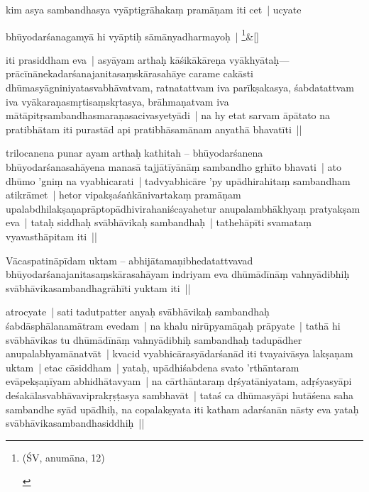 \documentclass[article,12pt,a4paper]{memoir}
\newcommand{\persName}[1]{#1}
\begin{document}
	  \pstart kim asya sambandhasya vyāptigrāhakaṃ pramāṇam iti cet | ucyate
	\pend
      
	    
	    \stanza[\smallbreak]
	bhūyodarśanagamyā hi vyāptiḥ sāmānyadharmayoḥ | \footnote{\begin{english}(ŚV, anumāna, 12)\end{english}}\&[\smallbreak]


	

	  \pstart iti prasiddham eva | asyāyam arthaḥ kāśikākāreṇa vyākhyātaḥ—prācīnānekadarśanajanitasaṃskārasahāye carame  cakāsti dhūmasyāgniniyatasvabhāvatvam, ratnatattvam iva parīkṣakasya, śabdatattvam iva vyākaraṇasmṛtisaṃskṛtasya, brāhmaṇatvam iva mātāpitṛsambandhasmaraṇasacivasyetyādi | na hy etat sarvam āpātato na pratibhātam iti purastād api pratibhāsamānam anyathā bhavatīti ||
	\pend
      

	  \pstart \persName{trilocanena} punar ayam arthaḥ kathitah – \label{sarit__ratnakīrtinibandhāvali__125156}bhūyodarśanena bhūyodarśanasahāyena manasā tajjātīyānāṃ sambandho gṛhīto bhavati | ato dhūmo 'gniṃ na vyabhicarati | tadvyabhicāre 'py upādhirahitaṃ sambandham atikrāmet | hetor vipakṣaśaṅkānivartakaṃ pramāṇam upalabdhilakṣaṇaprāptopādhivirahaniścayahetur anupalambhākhyaṃ pratyakṣam eva | tataḥ siddhaḥ svābhāvikaḥ sambandhaḥ | tathehāpīti svamataṃ vyavasthāpitam iti ||\label{sarit__ratnakīrtinibandhāvali__125583}
	\pend
      

	  \pstart Vācaspatināpīdam uktam – abhijātamaṇibhedatattvavad bhūyodarśanajanitasaṃskārasahāyam indriyam eva dhūmādīnāṃ vahnyādibhiḥ svābhāvikasambandhagrāhīti yuktam iti ||
	\pend
      

	  \pstart atrocyate |  sati tadutpatter anyaḥ svābhāvikaḥ sambandhaḥ śabdāsphālanamātram evedam | na khalu nirūpyamāṇaḥ prāpyate | tathā hi svābhāvikas tu dhūmādīnāṃ vahnyādibhiḥ sambandhaḥ tadupādher anupalabhyamānatvāt | kvacid vyabhicārasyādarśanād iti tvayaivāsya lakṣaṇam uktam | etac cāsiddham | yataḥ, upādhiśabdena svato 'rthāntaram evāpekṣaṇīyam abhidhātavyam | na cārthāntaraṃ dṛśyatāniyatam, adṛśyasyāpi deśakālasvabhāvaviprakṛṣṭasya sambhavāt | tataś ca dhūmasyāpi hutāśena saha sambandhe syād upādhiḥ, na copalakṣyata iti katham adarśanān nāsty eva yataḥ svābhāvikasambandhasiddhiḥ ||
	\pend
      
\end{document}
